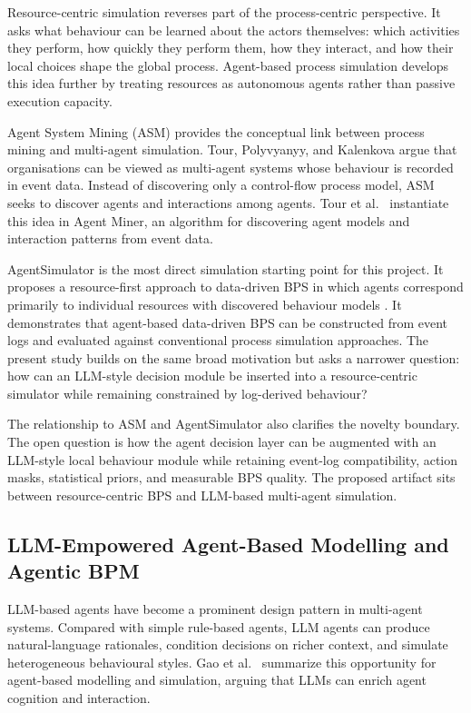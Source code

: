 Resource-centric simulation reverses part of the process-centric
perspective. It asks what behaviour can be learned about the actors
themselves: which activities they perform, how quickly they perform
them, how they interact, and how their local choices shape the global
process. Agent-based process simulation develops this idea further by
treating resources as autonomous agents rather than passive execution
capacity.

Agent System Mining (ASM) provides the conceptual link between process
mining and multi-agent simulation. Tour, Polyvyanyy, and Kalenkova
\cite{tour2021asm} argue that organisations can be viewed as multi-agent systems
whose behaviour is recorded in event data. Instead of discovering only a
control-flow process model, ASM seeks to discover agents and
interactions among agents. Tour et al.~\cite{tour2023agentminer} instantiate this idea in
Agent Miner, an algorithm for discovering agent models and interaction
patterns from event data.

AgentSimulator is the most direct simulation starting point for this
project. It proposes a resource-first approach to data-driven BPS in
which agents correspond primarily to individual resources with
discovered behaviour models \cite{kirchdorfer2024agentsimulator}. It
demonstrates that agent-based data-driven BPS can be constructed from
event logs and evaluated against conventional process simulation
approaches. The present study builds on the same broad motivation but
asks a narrower question: how can an LLM-style decision module be
inserted into a resource-centric simulator while remaining constrained
by log-derived behaviour?

The relationship to ASM and AgentSimulator also clarifies the novelty
boundary. The open question is how the agent decision layer can be
augmented with an LLM-style local behaviour module while retaining
event-log compatibility, action masks, statistical priors, and
measurable BPS quality. The proposed artifact sits between
resource-centric BPS and LLM-based multi-agent simulation.

\subsection{LLM-Empowered Agent-Based Modelling and Agentic
BPM}\label{llm-empowered-agent-based-modelling-and-agentic-bpm}

LLM-based agents have become a prominent design pattern in multi-agent
systems. Compared with simple rule-based agents, LLM agents can produce
natural-language rationales, condition decisions on richer context, and
simulate heterogeneous behavioural styles. Gao et al.~\cite{gao2024llmabm} summarize
this opportunity for agent-based modelling and simulation, arguing that
LLMs can enrich agent cognition and interaction.

